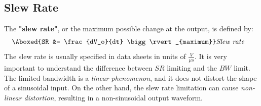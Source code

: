 \subsection{Slew Rate}
The \textbf{"slew rate"}, or the maximum possible change at the output, is defined by:
    \begin{align}
        \Aboxed{SR &= \frac{dV_o}{dt} \bigg\rvert_{maximum}}
        &\textit{Slew rate}
        \label{eq:slew_rate}
    \end{align}
The slew rate is usually specified in data sheets in units of $\frac{V}{\mu s}$.  It is very important to understand the difference between $SR$ limiting and the $BW$ limit.  The limited bandwidth is a \textit{linear phenomenon}, and it does not distort the shape of a sinusoidal input.  On the other hand, the slew rate limitation can cause \textit{non-linear distortion}, resulting in a non-sinusoidal output waveform.

